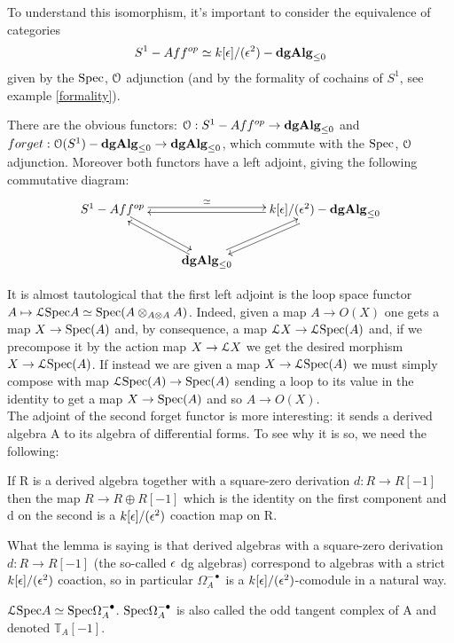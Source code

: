 \begin{refsection}
To understand this isomorphism, it's important to consider the equivalence of categories $$S^1-Aff^{op}\simeq k[\epsilon]/(\epsilon^2)-\mathbf{dgAlg}_{\leq 0}$$ 
given by the $\mathrm{Spec}$, $\mathcal{O}$ adjunction (and by the formality of cochains of $S^1$, see example \ref{formality}).

There are the obvious functors: $\mathcal{O} :S^1-Aff^{op}\to \mathbf{dgAlg}_{\leq 0}$ and $forget: \mathcal{O}(S^1)-\mathbf{dgAlg}_{\leq 0}\to\mathbf{dgAlg}_{\leq 0}$, which commute with the $\mathrm{Spec}$, $\mathcal{O}$ adjunction.
Moreover both functors have a left adjoint, giving the following commutative diagram:
\begin{displaymath}
\xymatrix{
S^1-Aff^{op} \ar@<2pt>[dr]  \ar@<2pt>[rr]^-\simeq&  & \cerchio-\dalg\ar@<2pt>[dl] \ar@<2pt>[ll]\\
& \dalg \ar@<2pt>[ur] \ar@<2pt>[ul]&
}
\end{displaymath}

It is almost tautological that the first left adjoint is the loop space functor $A\mapsto \mathcal{L}\mathrm{Spec} A\simeq \mathrm{Spec}(A\otimes_{A\otimes A}A)$.
Indeed, given a map $A\to O(X)$ one gets a map $X\to \mathrm{Spec}(A)$ and, by consequence, a map $\mathcal{L} X\to \mathcal{L}\mathrm{Spec}(A)$ and, if we precompose it by the action map $X\to \mathcal{L} X$
we get the desired morphism $X\to \mathcal{L}\mathrm{Spec}(A)$. If instead we are given a map $X\to \mathcal{L}\mathrm{Spec}(A)$ we must simply compose with map $\mathcal{L}\mathrm{Spec}(A)\to \mathrm{Spec}(A)$ sending a loop
to its value in the identity to get a map $X\to \mathrm{Spec}(A)$ and so $A\to O(X)$.\\

The adjoint of the second forget functor is more interesting: it sends a derived algebra A to its algebra of differential forms. To see why it is so, we need the following:
\begin{lemma}
If R is a derived algebra together with a square-zero derivation $d:R\to R[-1]$ then the map $R\to R\oplus R[-1]$ which is the identity on the first component
and d on the second is a $k[\epsilon]/(\epsilon^2)$ coaction map on R.
\end{lemma}

What the lemma is saying is that derived algebras with a square-zero derivation $d:R\to R[-1]$ (the so-called $\epsilon$ dg algebras) correspond to algebras with a
strict $k[\epsilon]/(\epsilon^2)$ coaction, so in particular $\Omega_A^{-\bullet}$ is a $k[\epsilon]/(\epsilon^2)$-comodule in a natural way.

\begin{proposition}
$\mathcal{L}\mathrm{Spec} A \simeq \mathrm{Spec}\Omega_A^{-\bullet}$. $\mathrm{Spec}\Omega_A^{-\bullet}$ is also called the odd tangent complex of A and denoted $\mathbb{T}_A[-1]$.
\end{proposition}


\end{refsection}

